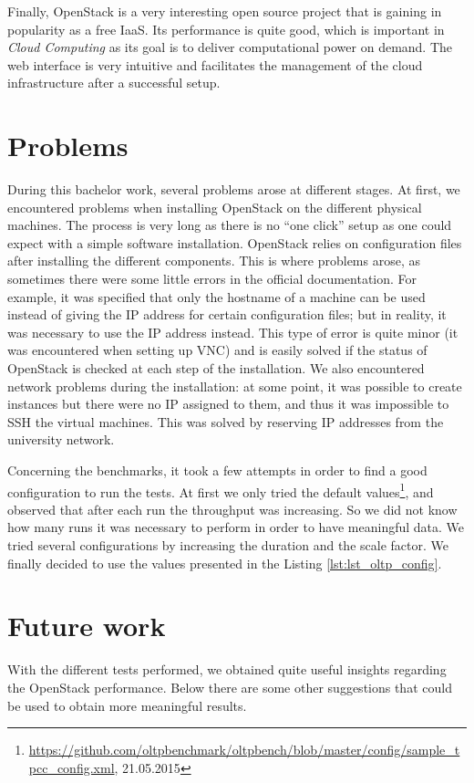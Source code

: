 Finally, OpenStack is a very interesting open source project that is gaining in popularity as a free IaaS.
Its performance is quite good, which is important in \textit{Cloud Computing} as its goal is to deliver computational power on demand.
The web interface is very intuitive and facilitates the management of the cloud infrastructure after a successful setup.







\section{Problems}
During this bachelor work, several problems arose at different stages. 
At first, we encountered problems when installing OpenStack on the different physical machines.
The process is very long as there is no ``one click'' setup as one could expect with a simple software installation.
OpenStack relies on configuration files after installing the different components.
This is where problems arose, as sometimes there were some little errors in the official documentation.
For example, it was specified that only the hostname of a machine can be used instead of giving the IP address for certain configuration files; but in reality, it was necessary to use the IP address instead. 
This type of error is quite minor (it was encountered when setting up VNC) and is easily solved if the status of OpenStack is checked at each step of the installation.
We also encountered network problems during the installation: at some point, it was possible to create instances but there were no IP assigned to them, and thus it was impossible to SSH the virtual machines.
This was solved by reserving IP addresses from the university network.

Concerning the benchmarks, it took a few attempts in order to find a good configuration to run the tests.
At first we only tried the default values\footnote{\url{https://github.com/oltpbenchmark/oltpbench/blob/master/config/sample_tpcc_config.xml}, 21.05.2015}, and observed that after each run the throughput was increasing.
So we did not know how many runs it was necessary to perform in order to have meaningful data.
We tried several configurations by increasing the duration and the scale factor.
We finally decided to use the values presented in the Listing \ref{lst:lst_oltp_config}.


\section{Future work}
With the different tests performed, we obtained quite useful insights regarding the OpenStack performance.
Below there are some other suggestions that could be used to obtain more meaningful results.

